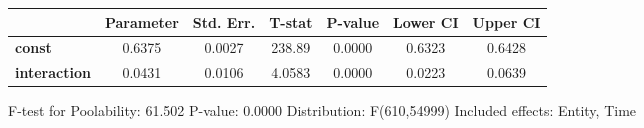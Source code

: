 \begin{center}
\begin{tabular}{lclc}
\end{tabular}
\begin{tabular}{lcccccc}
                     & \textbf{Parameter} & \textbf{Std. Err.} & \textbf{T-stat} & \textbf{P-value} & \textbf{Lower CI} & \textbf{Upper CI}  \\
\midrule
\textbf{const}       &       0.6375       &       0.0027       &      238.89     &      0.0000      &       0.6323      &       0.6428       \\
\textbf{interaction} &       0.0431       &       0.0106       &      4.0583     &      0.0000      &       0.0223      &       0.0639       \\
\bottomrule
\end{tabular}
\end{center}

F-test for Poolability: 61.502 \newline
 P-value: 0.0000 \newline
 Distribution: F(610,54999) \newline
  \newline
 Included effects: Entity, Time